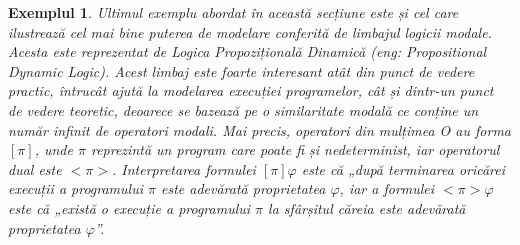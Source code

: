 \documentclass[12pt, openany]{book}
\newtheorem{example}[definition]{Exemplul} %
\newcommand{\myenglishterm}[1]{(\textit{eng: #1})}
\begin{document}
            \begin{example}
            \label{ex_pdl}
                Ultimul exemplu abordat în această secțiune este și cel care ilustrează cel mai bine puterea de modelare
                conferită de limbajul logicii modale. Acesta este reprezentat de Logica Propozițională Dinamică 
                \myenglishterm{Propositional Dynamic Logic}. Acest limbaj este foarte interesant atât din punct de 
                vedere practic, întrucât ajută la modelarea execuției programelor, cât și dintr-un punct de vedere 
                teoretic, deoarece se bazează pe o similaritate modală ce conține un număr infinit de operatori modali. 
                Mai precis, operatori din mulțimea O au forma $[\pi]$, unde $\pi$ reprezintă un program care poate fi și 
                nedeterminist, iar operatorul dual este $<\pi>$. Interpretarea formulei $[\pi] \varphi$ este că „după 
                terminarea oricărei execuții a programului $\pi$ este adevărată proprietatea $\varphi$, iar a formulei 
                $<\pi> \varphi$ este că „există o execuție a programului $\pi$ la sfârșitul căreia este adevărată 
                proprietatea $\varphi$”.


\end{example}
\end{document}

